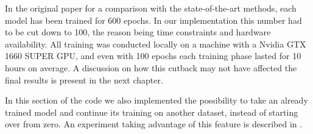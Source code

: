 In the original paper for a comparison with the state-of-the-art methods, each model has been trained for 
600 epochs. In our implementation this number had to be cut down to 100, the reason being time constraints 
and hardware availability. All training was conducted locally on a machine with a Nvidia GTX 1660 SUPER GPU, 
and even with 100 epochs each training phase lasted for 10 hours on average. A discussion on how this 
cutback may not have affected the final results is present in the next chapter.

In this section of the code we also implemented the possibility to take an already trained model and continue
its training on another dataset, instead of starting over from zero. An experiment taking advantage of this 
feature is described in .



